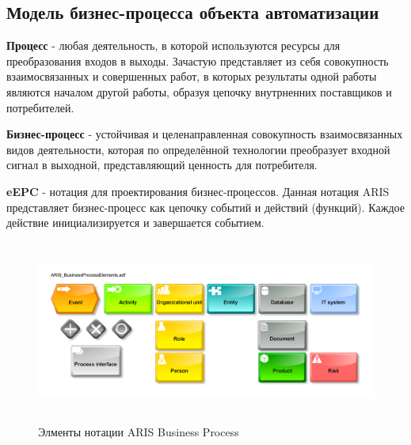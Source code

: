 


\newpage
\subsection{Модель бизнес-процесса объекта автоматизации}

\textbf{Процесс} - любая деятельность, в которой используются ресурсы для преобразования входов в выходы.
Зачастую представляет из себя совокупность взаимосвязанных и совершенных работ,
в которых результаты одной работы являются началом другой работы,
образуя цепочку внутрненних поставщиков и потребителей.

\textbf{Бизнес-процесс} - устойчивая и целенаправленная совокупность взаимосвязанных видов деятельности,
которая по определённой технологии преобразует входной сигнал в выходной, представляющий ценность для потребителя.

\textbf{eEPC} - нотация для проектирования бизнес-процессов.
Данная нотация ARIS представляет бизнес-процесс как цепочку событий и действий (функций).
Каждое действие инициализируется и завершается событием.

\begin{figure}[!h]
    \centering
  
    \includegraphics[height=6cm]
    {assets/ARIS/ARIS_BusinessProcessElements.adf.pdf}
    
    \caption{Элменты нотации ARIS Business Process}
    
    \label{fig:MBP_Product}
\end{figure}

